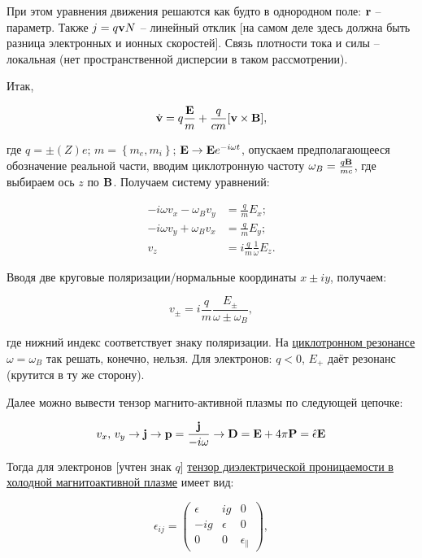\documentclass[10pt, a4paper]{article}
\begin{document}
При этом уравнения движения решаются как будто в однородном поле: $\vb{r}$ -- параметр. Также $j = q\vb{v}N$ -- линейный отклик [на самом деле здесь должна быть разница электронных и ионных скоростей]. Связь плотности тока и силы -- локальная (нет пространственной дисперсии в таком рассмотрении).

Итак,

\begin{equation*}
	\dot{\vb{v}}=q\frac{\vb{E}}{m}+\frac{q}{cm}[\vb{v}\times\vb{B}],
\end{equation*}

где $q=\pm (Z)e$; $m=\left\lbrace m_e, m_i\right\rbrace$; $\vb{E}\rightarrow\vb{E}e^{-i\omega t}$, опускаем предполагающееся обозначение реальной части, вводим циклотронную частоту $\vb{\omega}_B = \frac{q\vb{B}}{mc}$, где выбираем ось $z$ по $\vb{B}$. Получаем систему уравнений:

\begin{align*}
	-i\omega v_x-\omega_B v_y &= \frac{q}{m}E_x;\\
	-i\omega v_y +\omega_B v_x &= \frac{q}{m}E_y;\\
	v_z &= i\frac{q}{m}\frac{1}{\omega}E_z. 
\end{align*}

Вводя две круговые поляризации/нормальные координаты $x\pm iy$, получаем:

\begin{equation*}
	v_\pm = i\frac{q}{m}\frac{E_\pm}{\omega\pm\omega_B},
\end{equation*}

где нижний индекс соответствует знаку поляризации. На \uline{циклотронном резонансе} $\omega=\omega_B$ так решать, конечно, нельзя. Для электронов: $q<0$, $E_{+}$ даёт резонанс (крутится в ту же сторону).

Далее можно вывести тензор магнито-активной плазмы по следующей цепочке:

\begin{equation*}
	v_x,\,v_y\rightarrow\vb{j}\rightarrow\vb{p}=\frac{\vb{j}}{-i\omega}\rightarrow\vb{D}=\vb{E}+4\pi\vb{P}=\hat{\epsilon}\vb{E}
\end{equation*}

Тогда для электронов [учтен знак $q$] \uline{тензор диэлектрической проницаемости в холодной \linebreak магнитоактивной плазме} имеет вид:

\begin{equation*}
	\epsilon_{ij} =
	\begin{pmatrix}
		\epsilon & ig & 0 \\
		-ig & \epsilon & 0 \\
		0 & 0 & \epsilon_\parallel
	\end{pmatrix},
\end{equation*}
\end{document}
